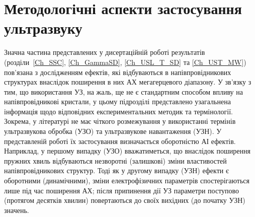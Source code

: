 %
%
%
%
%


\section{Методологічні аспекти застосування ультразвуку}

Значна частина представлених у дисертаційній роботі результатів (розділи~\ref{Ch_SSC}, \ref{Ch_GammaSD}, \ref{Ch_USL_T_SD} та \ref{Ch_UST_MW}) пов'язана з дослідженням ефектів, які відбуваються в напівпровідникових структурах внаслідок
поширення в них АХ мегагерцевого діапазону.
У зв'язку з тим, що використання УЗ, на жаль, ще не є стандартним способом впливу на напівпровідникові кристали,
у цьому підрозділі представлено узагальнена  інформація щодо відповідних експериментальних методик та термінології.
Зокрема, у літературі не має чіткого розмежування у використанні
термінів ультразвукова обробка (УЗО) та ультразвукове навантаження (УЗН).
У представленій роботі їх застосування визначається оборотністю АІ ефектів.
Наприклад, у першому випадку (УЗО) вважатиметься, що внаслідок поширення пружних хвиль відбуваються незворотні (залишкові) зміни властивостей напівпровідникових структур.
Тоді як у другому випадку (УЗН) ефекти є оборотними (динамічними), зміни електрофізичних параметрів спостерігаються лише під час поширення АХ;
після припинення дії УЗ параметри поступово (протягом десятків хвилин) повертаються до своїх вихідних (до початку УЗН) значень.

